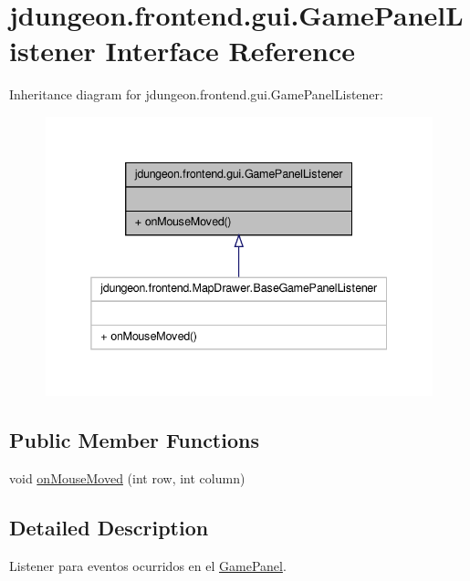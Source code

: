 \hypertarget{interfacejdungeon_1_1frontend_1_1gui_1_1_game_panel_listener}{
\section{jdungeon.frontend.gui.GamePanelListener Interface Reference}
\label{interfacejdungeon_1_1frontend_1_1gui_1_1_game_panel_listener}
}


Inheritance diagram for jdungeon.frontend.gui.GamePanelListener:
\nopagebreak
\begin{figure}[H]
\begin{center}
\leavevmode
\includegraphics[width=338pt]{interfacejdungeon_1_1frontend_1_1gui_1_1_game_panel_listener__inherit__graph}
\end{center}
\end{figure}
\subsection*{Public Member Functions}
\begin{DoxyCompactItemize}
\item 
void \hyperlink{interfacejdungeon_1_1frontend_1_1gui_1_1_game_panel_listener_a86d3b97fadbf5f6f040b67f19ff93503}{onMouseMoved} (int row, int column)
\end{DoxyCompactItemize}


\subsection{Detailed Description}
Listener para eventos ocurridos en el \hyperlink{classjdungeon_1_1frontend_1_1gui_1_1_game_panel}{GamePanel}. 

